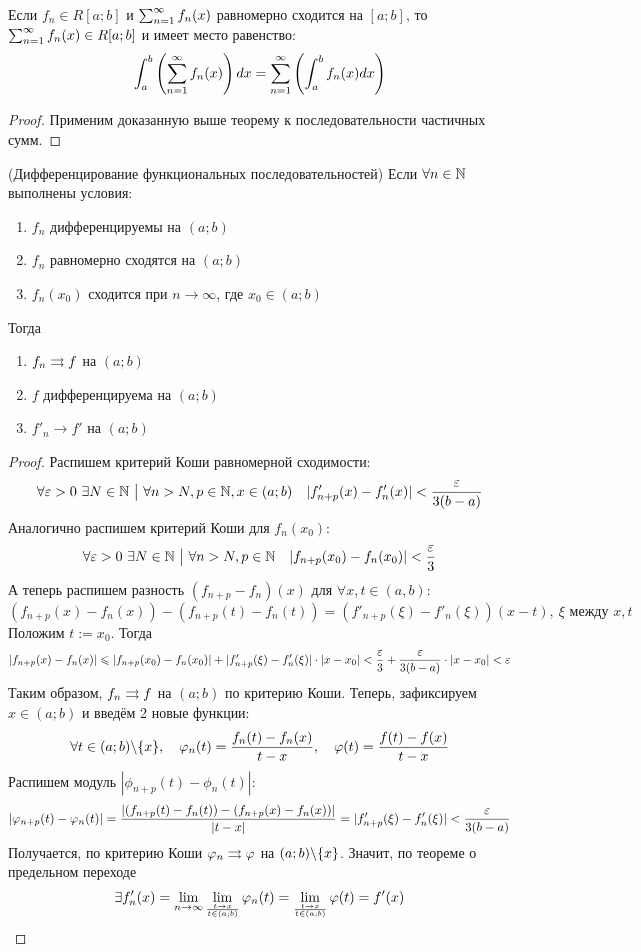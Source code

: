 \begin{theorem}
	Если $f_n \in R[a; b]$ и $\sum_{n = 1}^\infty f_n(x)$ равномерно сходится на $[a; b]$, то $\sum_{n = 1}^\infty f_n(x) \in R[a; b]$ и имеет место равенство:
	\[
		\int_a^b \left(\sum_{n = 1}^\infty f_n(x)\right)dx = \sum_{n = 1}^\infty \left(\int_a^b f_n(x)dx\right)
	\]
\end{theorem}

\begin{proof}
	Применим доказанную выше теорему к последовательности частичных сумм.
\end{proof}

\begin{theorem} (Дифференцирование функциональных последовательностей)
	Если $\forall n \in \mathbb{N}$ выполнены условия:
	\begin{enumerate}
		\item $f_n$ дифференцируемы на $(a; b)$
		
		\item $f_n$ равномерно сходятся на $(a; b)$
		
		\item $f_n(x_0)$ сходится при $n \to \infty$, где $x_0 \in (a; b)$
	\end{enumerate}
	Тогда
	\begin{enumerate}
		\item $f_n \rightrightarrows f$ на $(a; b)$
		
		\item $f$ дифференцируема на $(a; b)$
		
		\item $f'_n \to f'$ на $(a; b)$
	\end{enumerate}
\end{theorem}

\begin{proof}
	Распишем критерий Коши равномерной сходимости:
	\[
		\forall \varepsilon > 0\ \exists N \in \mathbb{N} \ \big|\  \forall n > N, p \in \mathbb{N}, x \in (a; b) \quad |f'_{n + p}(x) - f'_n(x)| < \frac{\varepsilon}{3(b - a)}
	\]
	Аналогично распишем критерий Коши для $f_n(x_0)$:
	\[
		\forall \varepsilon > 0\ \exists N \in \mathbb{N} \ \big|\  \forall n > N, p \in \mathbb{N} \quad |f_{n + p}(x_0) - f_n(x_0)| < \frac{\varepsilon}{3}
	\]
	А теперь распишем разность $(f_{n + p} - f_n)(x)$ для $\forall x, t \in (a, b)$:
	\[
		(f_{n + p}(x) - f_n(x)) - (f_{n + p}(t ) - f_n(t)) = (f'_{n + p}(\xi) - f'_n(\xi))(x - t),\ \xi \text{ между } x, t
	\]
	Положим $t := x_0$. Тогда
	\[
		|f_{n + p}(x) - f_n(x)| \leqslant |f_{n + p}(x_0) - f_n(x_0)| + |f'_{n + p}(\xi) - f'_n(\xi)| \cdot |x - x_0| < \frac{\varepsilon}{3} + \frac{\varepsilon}{3(b - a)} \cdot |x - x_0| < \varepsilon
	\]
	Таким образом, $f_n \rightrightarrows f$ на $(a; b)$ по критерию Коши. Теперь, зафиксируем $x \in (a; b)$ и введём 2 новые функции:
	\[
		\forall t \in (a; b) \backslash \{x\}, \quad \varphi_n(t) = \frac{f_n(t) - f_n(x)}{t - x}, \quad \varphi(t) = \frac{f(t) - f(x)}{t - x}
	\]
	Распишем модуль $|\phi_{n + p}(t) - \phi_n(t)|$:
	\[
		|\varphi_{n + p}(t) - \varphi_n(t)| = \frac{|(f_{n + p}(t) - f_n(t)) - (f_{n + p}(x) - f_n(x))|}{|t - x|} = |f'_{n + p}(\xi) - f'_n(\xi)| < \frac{\varepsilon}{3(b - a)}
	\]
	Получается, по критерию Коши $\varphi_n \rightrightarrows \varphi$ на $(a; b) \backslash \{x\}$. Значит, по теореме о предельном переходе
	\[
		\exists f'_n(x) = \lim\limits_{n \to \infty} \lim\limits_{t \to x \over t \in (a; b)} \varphi_n(t) = \lim\limits_{t \to x \over t \in (a; b)} \varphi(t) = f'(x)
	\]
\end{proof}